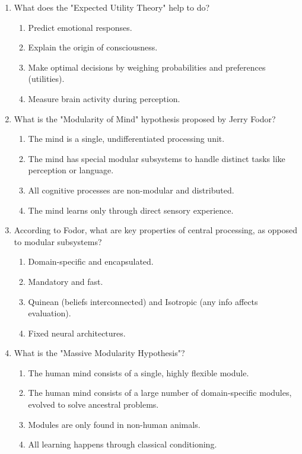 \documentclass{article}
\begin{document}
\begin{enumerate}[label=\arabic*.]
\item What does the "Expected Utility Theory" help to do?
\begin{enumerate}[label=(\alph*)]
    \item Predict emotional responses.
    \item Explain the origin of consciousness.
    \item Make optimal decisions by weighing probabilities and preferences (utilities).
    \item Measure brain activity during perception.
\end{enumerate}

\item What is the "Modularity of Mind" hypothesis proposed by Jerry Fodor?
\begin{enumerate}[label=(\alph*)]
    \item The mind is a single, undifferentiated processing unit.
    \item The mind has special modular subsystems to handle distinct tasks like perception or language.
    \item All cognitive processes are non-modular and distributed.
    \item The mind learns only through direct sensory experience.
\end{enumerate}

\item According to Fodor, what are key properties of central processing, as opposed to modular subsystems?
\begin{enumerate}[label=(\alph*)]
    \item Domain-specific and encapsulated.
    \item Mandatory and fast.
    \item Quinean (beliefs interconnected) and Isotropic (any info affects evaluation).
    \item Fixed neural architectures.
\end{enumerate}

\item What is the "Massive Modularity Hypothesis"?
\begin{enumerate}[label=(\alph*)]
    \item The human mind consists of a single, highly flexible module.
    \item The human mind consists of a large number of domain-specific modules, evolved to solve ancestral problems.
    \item Modules are only found in non-human animals.
    \item All learning happens through classical conditioning.
\end{enumerate}


\end{enumerate}
\end{document}
